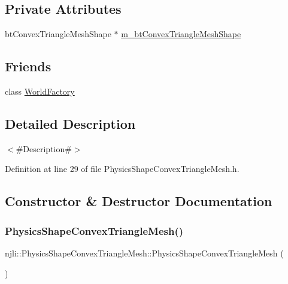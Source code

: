 \subsection*{Private Attributes}
\begin{DoxyCompactItemize}
\item 
bt\+Convex\+Triangle\+Mesh\+Shape $\ast$ \mbox{\hyperlink{classnjli_1_1_physics_shape_convex_triangle_mesh_a3ec48ca0d0ac09d99c17e13b7fb61e20}{m\+\_\+bt\+Convex\+Triangle\+Mesh\+Shape}}
\end{DoxyCompactItemize}
\subsection*{Friends}
\begin{DoxyCompactItemize}
\item 
class \mbox{\hyperlink{classnjli_1_1_physics_shape_convex_triangle_mesh_acb96ebb09abe8f2a37a915a842babfac}{World\+Factory}}
\end{DoxyCompactItemize}


\subsection{Detailed Description}
$<$\#\+Description\#$>$ 

Definition at line 29 of file Physics\+Shape\+Convex\+Triangle\+Mesh.\+h.



\subsection{Constructor \& Destructor Documentation}
\mbox{\label{classnjli_1_1_physics_shape_convex_triangle_mesh_ab5f351b3bf15c7bcb636031dbe8914b1}} 
\subsubsection{\texorpdfstring{Physics\+Shape\+Convex\+Triangle\+Mesh()}{PhysicsShapeConvexTriangleMesh()}\hspace{0.1cm}{\footnotesize\ttfamily [1/3]}}
{\footnotesize\ttfamily njli\+::\+Physics\+Shape\+Convex\+Triangle\+Mesh\+::\+Physics\+Shape\+Convex\+Triangle\+Mesh (\begin{DoxyParamCaption}{ }\end{DoxyParamCaption})\hspace{0.3cm}{\ttfamily [protected]}}

